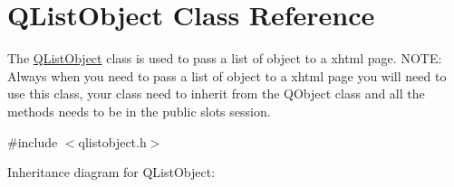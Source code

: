 \hypertarget{class_q_list_object}{}\section{Q\+List\+Object Class Reference}
\label{class_q_list_object}


The \hyperlink{class_q_list_object}{Q\+List\+Object} class is used to pass a list of object to a xhtml page. N\+O\+TE\+: Always when you need to pass a list of object to a xhtml page you will need to use this class, your class need to inherit from the Q\+Object class and all the methods needs to be in the public slots session.  




{\ttfamily \#include $<$qlistobject.\+h$>$}



Inheritance diagram for Q\+List\+Object\+:
